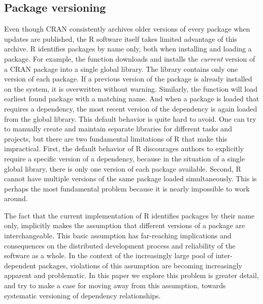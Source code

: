 
\subsection{Package versioning}

Even though CRAN consistently archives older versions of every package when
updates are published, the R software itself takes limited advantage of this archive.
R identifies packages by name only, both when installing and loading a package.
For example, the  function downloads and installs the
\emph{current} version of a CRAN package into a single global library. The
library contains only one version of each package. If a previous version of
the package is already installed on the system, it is overwritten without
warning. Similarly, the  function will load earliest found
package with a matching name. And when a package is loaded that requires a
dependency, the most recent version of the dependency is again loaded from the
global library. This default behavior is quite hard to avoid. One can try to
manually create and maintain separate libraries for different tasks and
projects, but there are two fundamental limitations of R that make this
impractical. First, the default behavior of R discourages authors to explicitly
require a specific version of a dependency, because in the situation of a
single global library, there is only one version of each package available.
Second, R cannot have multiple versions of the same package loaded
simultaneously. This is perhaps the most fundamental problem because it is
nearly impossible to work around.

The fact that the current implementation of R identifies packages by their name
only, implicitly makes the assumption that different versions of a package are
interchangeable. This basic assumption has far-reaching implications and
consequences on the distributed development process and reliability of the
software as a whole. In the context of the increasingly large pool of
inter-dependent packages, violations of this assumption are becoming
increasingly apparent and problematic. In this paper we explore this problem is
greater detail, and try to make a case for moving away from this assumption,
towards systematic versioning of dependency relationships.

